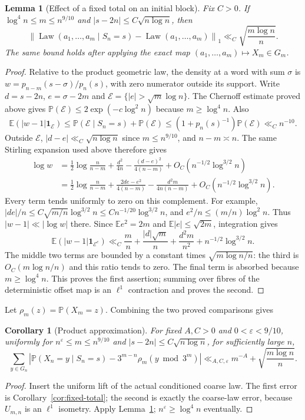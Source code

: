 \documentclass[11pt]{article}
\newtheorem{corollary}[proposition]{Corollary}
\newtheorem{lemma}[proposition]{Lemma}
\theoremstyle{remark}\newtheorem{remark}[proposition]{Remark}
\newcommand{\PP}{\mathbb P}
\newcommand{\EE}{\mathbb E}
\newcommand{\one}{\mathbf 1}
\begin{document}
\begin{lemma}[Effect of a fixed total on an initial block]\label{lem:coarse-tilt}
Fix $C>0$. If $\log^4n\le m\le n^{9/10}$ and
$|s-2n|\le C\sqrt{n\log n}$, then
\[
 \left\|\operatorname{Law}(a_1,\ldots,a_m\mid S_n=s)
       -\operatorname{Law}(a_1,\ldots,a_m)\right\|_1
 \ll_C\sqrt{\frac{m\log n}{n}}.
\]
The same bound holds after applying the exact map
$(a_1,\ldots,a_m)\mapsto X_m\in G_m$.
\end{lemma}
\begin{proof}
Relative to the product geometric law, the density at a word with sum
$\sigma$ is $w=p_{n-m}(s-\sigma)/p_n(s)$, with zero numerator outside
its support. Write $d=s-2n$, $e=\sigma-2m$ and
$\mathcal E=\{|e|>\sqrt m\log n\}$. The Chernoff estimate proved above
gives $\PP(\mathcal E)\le2\exp(-c\log^2n)$ because
$m\ge\log^4n$. Also
\[
 \EE(|w-1|\one_{\mathcal E})
 \le\PP(\mathcal E\mid S_n=s)+\PP(\mathcal E)
 \le(1+p_n(s)^{-1})\PP(\mathcal E)\ll_C n^{-10}.
\]
Outside $\mathcal E$, $|d-e|\ll_C\sqrt{n\log n}$ since
$m\le n^{9/10}$, and $n-m\asymp n$. The same Stirling expansion used
above therefore gives
\begin{align*}
 \log w
 &=\tfrac12\log\frac n{n-m}
   +\frac{d^2}{4n}-\frac{(d-e)^2}{4(n-m)}
   +O_C(n^{-1/2}\log^{3/2}n)\\
 &=\tfrac12\log\frac n{n-m}
   +\frac{2de-e^2}{4(n-m)}-\frac{d^2m}{4n(n-m)}
   +O_C(n^{-1/2}\log^{3/2}n).
\end{align*}
Every term tends uniformly to zero on this complement. For example,
$|de|/n\le C\sqrt{m/n}\log^{3/2}n\le Cn^{-1/20}\log^{3/2}n$,
and $e^2/n\le(m/n)\log^2n$. Thus $|w-1|\ll|\log w|$ there.
Since $\EE e^2=2m$ and $\EE|e|\le\sqrt{2m}$, integration gives
\[
 \EE(|w-1|\one_{\mathcal E^c})
 \ll_C \frac mn+\frac{|d|\sqrt m}{n}
       +\frac{d^2m}{n^2}+n^{-1/2}\log^{3/2}n.
\]
The middle two terms are bounded by a constant times
$\sqrt{m\log n/n}$: the third is $O_C(m\log n/n)$ and this ratio
tends to zero. The final term is absorbed because $m\ge\log^4n$.
This proves the first assertion; summing over fibres of the deterministic
offset map is an $\ell^1$ contraction and proves the second.
\end{proof}

Let $\rho_m(z)=\PP(X_m=z)$. Combining the two proved comparisons gives
\begin{corollary}[Product approximation]\label{cor:product}
For fixed $A,C>0$ and $0<\varepsilon<9/10$, uniformly for
$n^\varepsilon\le m\le n^{9/10}$ and
$|s-2n|\le C\sqrt{n\log n}$, for sufficiently large $n$,
\[
 \sum_{y\in G_n}\left|\PP(X_n=y\mid S_n=s)
       -3^{m-n}\rho_m(y\bmod3^m)\right|
 \ll_{A,C,\varepsilon}m^{-A}+\sqrt{\frac{m\log n}{n}}.
\]
\end{corollary}
\begin{proof}
Insert the uniform lift of the actual conditioned coarse law. The first
error is Corollary~\ref{cor:fixed-total}; the second is exactly the
coarse-law error, because $U_{m,n}$ is an $\ell^1$ isometry. Apply
Lemma~\ref{lem:coarse-tilt}; $n^\varepsilon\ge\log^4n$ eventually.
\end{proof}
\end{document}
